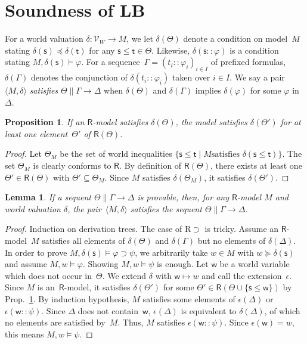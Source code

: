 \documentclass[doctor]{iscs-thesis}
\newcommand{\tuple}[1]{\langle{#1}\rangle}
\newtheorem{proposition}{Proposition}
\newtheorem{lemma}{Lemma}
\begin{document}
\section{Soundness of LB}

For a world valuation $\delta:\mathcal V_W\longrightarrow M$,
we let $\delta(\Theta)$ denote a condition on
model~$M$ stating $\delta(\mathsf s)\preceq \delta(\mathsf t)$ for any
$\mathsf s\le \mathsf t\in\Theta$.
Likewise, $\delta(\mathsf s::\varphi)$ is a condition stating
$M,\delta(\mathsf s)\models\varphi$.  For a sequence~$\Gamma =
(t_i::\varphi_i)_{i\in I}$ of
prefixed formulas, $\delta(\Gamma)$ denotes the conjunction
of $\delta(t_i::\varphi_i)$ taken over $i\in I$.
   We say a pair
$\tuple{M,\delta}$ \textit{satisfies}
$\Theta\parallel\Gamma\longrightarrow\Delta$ when $\delta(\Theta)$ and
$\delta(\Gamma)$ implies $\delta(\varphi)$ for some $\varphi$
in~$\Delta$.

\begin{proposition}
 \label{exp-sound}
 If an $\mathsf R$-model satisfies $\delta(\Theta)$,
 the model satisfies $\delta(\Theta')$ for 
 at least one element~$\Theta'$ of $\mathsf R(\Theta)$.
\end{proposition}
\begin{proof}
 Let $\Theta_M$ be the set of world inequalities
 $\{\mathsf s\le \mathsf t\mid M\mbox{
 satisfies }\delta(\mathsf s\le \mathsf t)\}$.
 The set $\Theta_M$ is clearly conforms to $\mathsf R$.
 By definition of $\mathsf R(\Theta)$, there exists at least one $\Theta'\in
 \mathsf R(\Theta)$ with $\Theta'\subseteq \Theta_M$.
 Since $M$ satisfies $\delta(\Theta_M)$, it satisfies $\delta(\Theta')$.
\end{proof}

\begin{lemma}
 \label{sound}
If a sequent $\Theta\parallel \Gamma\longrightarrow \Delta$ is
provable,
then, for any $\mathsf R$-model $M$ and world valuation $\delta$,
the pair~$\tuple{M,\delta}$ satisfies the sequent $\Theta\parallel
 \Gamma\rightarrow\Delta$.
\end{lemma}
\begin{proof}
Induction on derivation trees.
 The case of R$\supset$ is tricky.
 Assume an $\mathsf R$-model~$M$ satisfies all elements of
 $\delta(\Theta)$ and $\delta(\Gamma)$ but no elements of $\delta(\Delta)$.
 In order to prove $M,\delta(\mathsf s)\models\varphi\supset\psi$, we
 arbitrarily take $w\in M$ with $ w\succeq \delta(\mathsf s)$ and assume $M,
  w\models\varphi$.
 Showing $M,w\models\psi$ is enough.
 Let $\mathsf w$ be a world variable which does not occur in~$\Theta$.
 We extend $\delta$ with $\mathsf{w}\mapsto w$ and call the extension~$\epsilon$.
 Since $M$ is an~$\mathsf R$-model,
 it satisfies $\delta(\Theta')$ for some $\Theta'\in \mathsf R(\Theta\cup
 \{\mathsf s\le \mathsf w\})$ by Prop.~\ref{exp-sound}.
 By induction hypothesis, $M$ satisfies some elements of $\epsilon(\Delta)$ or
 $\epsilon(\mathsf w::\psi)$. Since $\Delta$ does not contain~$\mathsf w$,
 $\epsilon(\Delta)$ is equivalent to $\delta(\Delta)$, of which no elements are
 satisfied by~$M$.
 Thus, $M$ satisfies $\epsilon(\mathsf w::\psi)$.
 Since $\epsilon(\mathsf w) = w$, this means $M,  w\models\psi$.
\end{proof}
\end{document}
